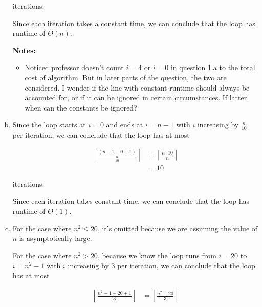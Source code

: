 \documentclass[12pt]{article}
\begin{document}
\begin{enumerate}[a.]
\begin{mdframed}
        iterations.

        \bigskip

        Since each iteration takes a constant time, we can conclude that the loop has
        runtime of \color{red}$\Theta(n)$\color{black}.

    \end{mdframed}

    \bigskip

    \textbf{Notes:}

    \begin{itemize}
        \item Noticed professor doesn't count $i = 4$ or $i = 0$ in question 1.a
        to the total cost of algorithm. But in later parts of the question, the two
        are considered. I wonder if the line with constant runtime
        should always be accounted for, or if it can be ignored in certain circumstances.
        If latter, when can the constants be ignored?

    \end{itemize}

    \item

    Since the loop starts at $i = 0$ and ends at $i = n-1$ with $i$ increasing
    by $\frac{n}{10}$ per iteration, we can conclude that the loop has at most

    \setcounter{equation}{0}
    \begin{align}
        \left\lceil \frac{(n-1-0+1)}{\frac{n}{10}} \right\rceil &= \left\lceil \frac{n \cdot 10}{n} \right\rceil\\
        &= 10
    \end{align}

    iterations.

    \bigskip

    Since each iteration takes constant time, we can conclude that the loop has
    runtime of $\Theta(1)$.

    \item

    For the case where $n^2 \leq 20$, it's omitted because we are assuming the
    value of $n$ is asymptotically large.

    \bigskip

    For the case where $n^2 > 20$, because we know the loop runs from $i = 20$ to
    $i = n^2 - 1$ with $i$ increasing by 3 per iteration, we can conclude that the
    loop has at most

    \setcounter{equation}{0}
    \begin{align}
        \left\lceil \frac{n^2 - 1 - 20 + 1}{3} \right\rceil &= \left\lceil \frac{n^2 - 20}{3} \right\rceil
    \end{align}


\end{enumerate}
\end{document}
